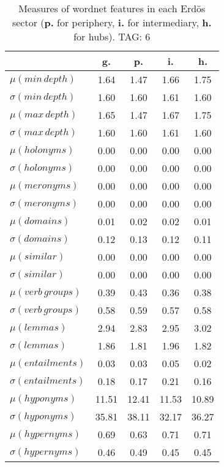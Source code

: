 \begin{table}[h!]
\begin{center}
\begin{tabular}{| l || c | c | c | c |}\hline
 & {\bf g.} & {\bf p.} & {\bf i.} & {\bf h.} \\\hline\hline
$\mu(min\,depth)$ & 1.64  & 1.47  & 1.66  & 1.75 \\
$\sigma(min\,depth)$ & 1.60  & 1.60  & 1.61  & 1.60 \\\hline
$\mu(max\,depth)$ & 1.65  & 1.47  & 1.67  & 1.75 \\
$\sigma(max\,depth)$ & 1.60  & 1.60  & 1.61  & 1.60 \\\hline
$\mu(holonyms)$ & 0.00  & 0.00  & 0.00  & 0.00 \\
$\sigma(holonyms)$ & 0.00  & 0.00  & 0.00  & 0.00 \\\hline
$\mu(meronyms)$ & 0.00  & 0.00  & 0.00  & 0.00 \\
$\sigma(meronyms)$ & 0.00  & 0.00  & 0.00  & 0.00 \\\hline
$\mu(domains)$ & 0.01  & 0.02  & 0.02  & 0.01 \\
$\sigma(domains)$ & 0.12  & 0.13  & 0.12  & 0.11 \\\hline
$\mu(similar)$ & 0.00  & 0.00  & 0.00  & 0.00 \\
$\sigma(similar)$ & 0.00  & 0.00  & 0.00  & 0.00 \\\hline
$\mu(verb\,groups)$ & 0.39  & 0.43  & 0.36  & 0.38 \\
$\sigma(verb\,groups)$ & 0.58  & 0.59  & 0.57  & 0.58 \\\hline
$\mu(lemmas)$ & 2.94  & 2.83  & 2.95  & 3.02 \\
$\sigma(lemmas)$ & 1.86  & 1.81  & 1.96  & 1.82 \\\hline
$\mu(entailments)$ & 0.03  & 0.03  & 0.05  & 0.02 \\
$\sigma(entailments)$ & 0.18  & 0.17  & 0.21  & 0.16 \\\hline
$\mu(hyponyms)$ & 11.51  & 12.41  & 11.53  & 10.89 \\
$\sigma(hyponyms)$ & 35.81  & 38.11  & 32.17  & 36.27 \\\hline
$\mu(hypernyms)$ & 0.69  & 0.63  & 0.71  & 0.71 \\
$\sigma(hypernyms)$ & 0.46  & 0.49  & 0.45  & 0.45 \\\hline
\end{tabular}
\caption{Measures of wordnet features in each Erd\"os sector ({{\bf p.}} for periphery, {{\bf i.}} for intermediary, {{\bf h.}} for hubs). TAG: 6}
\end{center}
\end{table}